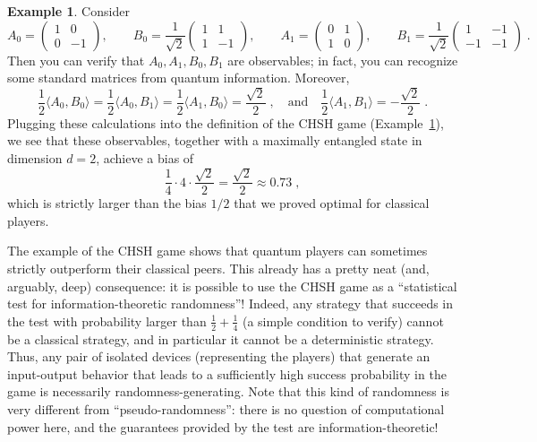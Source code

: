 \documentclass{report}
\theoremstyle{plain}
\theoremstyle{definition}
\newtheorem{example}[subsection]{Example}
\theoremstyle{remark}
\numberwithin{equation}{subsection}
\begin{document}
\begin{example}\label{ex:chsh}
Consider 
\begin{equation*}
A_0=\left(\begin{array}{cc}1&0\\0&-1\end{array}\right),\qquad
B_0=\frac{1}{\sqrt{2}}\left(\begin{array}{cc}1&1\\1&-1\end{array}\right),\qquad
A_1=\left(\begin{array}{cc}0&1\\1&0\end{array}\right),\qquad
B_1=\frac{1}{\sqrt{2}}\left(\begin{array}{cc}1&-1\\-1&-1\end{array}\right)\;.
\end{equation*}
Then you can verify that $A_0,A_1,B_0,B_1$ are observables; in fact, you can recognize some standard matrices from quantum information. Moreover, 
$$\frac{1}{2} \langle A_0, B_0\rangle = \frac{1}{2}\langle A_0, B_1\rangle = \frac{1}{2} \langle A_1, B_0\rangle =\frac{\sqrt{2}}{2}\;,\quad\text{and}\quad \frac{1}{2}\langle  A_1,B_1\rangle = -\frac{\sqrt{2}}{2}\;.$$
 Plugging these calculations into the definition of the CHSH game (Example~\ref{ex:chsh}), we see that these observables, together with a maximally entangled state in dimension $d=2$, achieve a bias of
$$
\frac{1}{4}\cdot 4\cdot \frac{\sqrt{2}}{2} =\frac{\sqrt{2}}{2} \approx 0.73\;,
$$
which is strictly larger than the bias $1/2$ that we proved optimal for classical players.
\end{example}

The example of the CHSH game shows that quantum players can sometimes strictly outperform their classical peers. This already has a pretty neat (and, arguably, deep) consequence: it is possible to use the CHSH game as a ``statistical test for information-theoretic randomness''! Indeed, any strategy that succeeds in the test  with probability larger than $\frac{1}{2} + \frac{1}{4}$ (a simple condition to verify) cannot be a classical strategy, and in particular it cannot be a deterministic strategy. Thus, any pair of isolated devices (representing the players) that generate an input-output behavior that leads to a sufficiently high success probability in the game is necessarily randomness-generating. Note that this kind of randomness is very different from ``pseudo-randomness'': there is no question of computational power here, and the guarantees provided by the test are information-theoretic!
\end{document}
